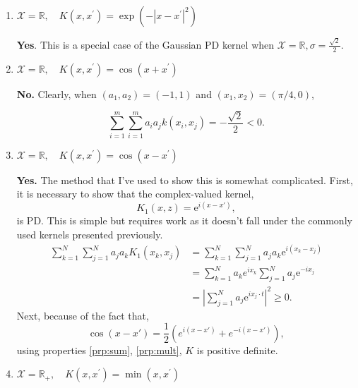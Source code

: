 \documentclass{article}[12pt]
\begin{document}
\begin{enumerate}
\item $\mathcal{X}=\mathbb{R}, \quad K\left(x, x^{\prime}\right)=\exp \left(-\left|x-x^{\prime}\right|^{2}\right)$

\textbf{Yes}. This is a special case of the Gaussian PD kernel when $\mathcal X = \mathbb R, \sigma=\frac{\sqrt 2}{2}$.

\item $\mathcal{X}=\mathbb{R}, \quad K\left(x, x^{\prime}\right)=\cos \left(x+x^{\prime}\right)$

\textbf{No.} Clearly, when $(a_1, a_2) = (-1, 1)$ and $(x_1, x_2)=(\pi/4, 0)$, 

\begin{equation}
\sum_{i=1}^{m} \sum_{i=1}^{m} a_{i} a_{j} k\left(x_{i}, x_{j}\right) = -\frac{\sqrt 2}{2} < 0.
\end{equation}

\item $\mathcal{X}=\mathbb{R}, \quad K\left(x, x^{\prime}\right)=\cos \left(x-x^{\prime}\right)$

\textbf{Yes.} The method that I've used to show this is somewhat complicated. First, it is necessary to show that the complex-valued kernel,
\begin{equation}
K_{1}(x, z)=\mathrm{e}^{i(x-x') },
\end{equation}
is PD. This is simple but requires work as it doesn't fall under the commonly used kernels presented previously. 
\begin{equation}
\begin{aligned} \sum_{k=1}^{N} \sum_{j=1}^{N} a_{j} a_{k} K_{1}\left(x_{k}, x_{j}\right) &=\sum_{k=1}^{N} \sum_{j=1}^{N} a_{j} a_k \mathrm{e}^{i\left(x_{k}-x_{j}\right) } \\ &=\sum_{k=1}^{N} a_{k} e^{i x_{k}} \sum_{j=1}^{N} a_{j} \mathrm{e}^{-i x_{j}} \\ &=\left|\sum_{j=1}^{N} a_{j} \mathrm{e}^{i x_{j} \cdot t}\right|^{2} \geq 0. \end{aligned}
\end{equation}
Next, because of the fact that,
\begin{equation}
\cos (x-x')=\frac{1}{2}\left(e^{i(x-x')}+e^{-i(x-x')}\right),
\end{equation}
using properties \ref{prp:sum}, \ref{prp:mult}, $K$ is positive definite.

\item $\mathcal{X}=\mathbb{R}_{+}, \quad K\left(x, x^{\prime}\right)=\min \left(x, x^{\prime}\right)$


\end{enumerate}
\end{document}
